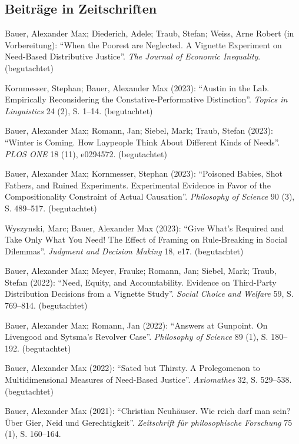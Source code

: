 \documentclass[a4paper,10pt]{article}
\newenvironment{literature}{%
   \parskip6pt\parindent0pt\raggedright
   \def\lititem{\hangindent=1cm\hangafter1}}{%
   \par\ignorespaces}
\begin{document}
\subsection*{Beiträge in Zeitschriften}
\begin{literature}
\lititem Bauer, Alexander Max; Diederich, Adele; Traub, Stefan; Weiss, Arne Robert (in Vorbereitung): \enquote{When the Poorest are Neglected. A Vignette Experiment on Need-Based Distributive Justice}. \textit{The Journal of Economic Inequality}. (begutachtet)

\lititem Kornmesser, Stephan; Bauer, Alexander Max (2023): \enquote{Austin in the Lab. Empirically Reconsidering the Constative-Performative Distinction}. \textit{Topics in Linguistics} 24 (2), S. 1--14. (begutachtet)

\lititem Bauer, Alexander Max; Romann, Jan; Siebel, Mark; Traub, Stefan (2023): \enquote{Winter is Coming. How Laypeople Think About Different Kinds of Needs}. \textit{PLOS ONE} 18 (11), e0294572. (begutachtet)

\lititem Bauer, Alexander Max; Kornmesser, Stephan (2023): \enquote{Poisoned Babies, Shot Fathers, and Ruined Experiments. Experimental Evidence in Favor of the Compositionality Constraint of Actual Causation}. \textit{Philosophy of Science} 90 (3), S. 489--517. (begutachtet)

\lititem Wyszynski, Marc; Bauer, Alexander Max (2023): \enquote{Give What's Required and Take Only What You Need! The Effect of Framing on Rule-Breaking in Social Dilemmas}. \textit{Judgment and Decision Making} 18, e17. (begutachtet)

\lititem Bauer, Alexander Max; Meyer, Frauke; Romann, Jan; Siebel, Mark; Traub, Stefan (2022): \enquote{Need, Equity, and Accountability. Evidence on Third-Party Distribution Decisions from a Vignette Study}. \textit{Social Choice and Welfare} 59, S. 769--814. (begutachtet)

\lititem Bauer, Alexander Max; Romann, Jan (2022): \enquote{Answers at Gunpoint. On Livengood and Sytsma's Revolver Case}. \textit{Philosophy of Science} 89 (1), S. 180--192. (begutachtet)

\lititem Bauer, Alexander Max (2022): \enquote{Sated but Thirsty. A Prolegomenon to Multidimensional Measures of Need-Based Justice}. \textit{Axiomathes} 32, S. 529--538. (begutachtet)

\lititem Bauer, Alexander Max (2021): \enquote{Christian Neuhäuser. Wie reich darf man
sein? Über Gier, Neid und Gerechtigkeit}. \textit{Zeitschrift für philosophische Forschung} 75 (1), S. 160--164.


\end{literature}
\end{document}
